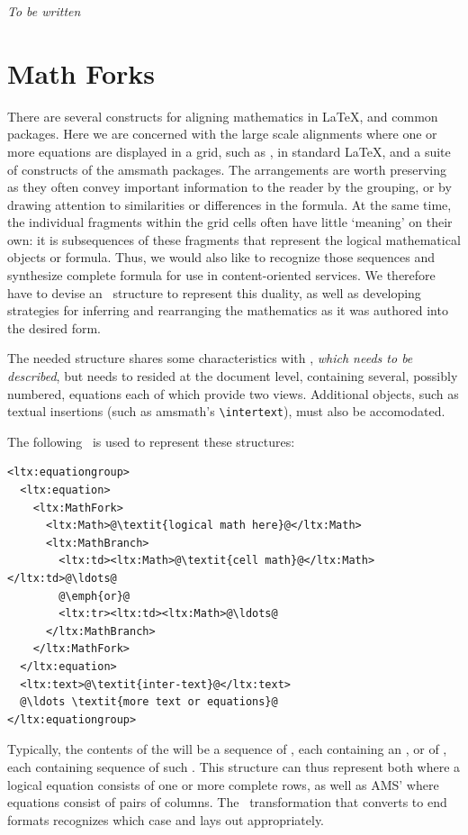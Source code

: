 \documentclass{book}
\begin{document}
\emph{To be written}

\section{Math Forks}\label{alignments.mathfork}
There are several constructs for aligning mathematics in \LaTeX, and common
packages. Here we are concerned with the large scale alignments where
one or more equations are displayed in a grid,
such as , in standard \LaTeX,
and a suite of constructs of the amsmath packages.
The arrangements are worth preserving as they often convey important information to the
reader by the grouping, or by drawing attention to similarities or differences
in the formula.   At the same time, the individual fragments within the grid
cells often have little `meaning' on their own:
it is subsequences of these fragments that represent the logical
mathematical objects or formula.  Thus, we would also like to
recognize those sequences and synthesize complete formula
for use in content-oriented services.
We therefore have to devise an \XML\ structure to represent this duality,
as well as developing strategies for inferring and rearranging
the mathematics as it was authored into the desired form.

The needed structure shares some characteristics with ,
\emph{which needs to be described},
but needs to resided at the document level, containing several,
possibly numbered, equations each of which provide two views.
Additional objects, such as textual insertions (such as amsmath's \verb|\intertext|),
must also be accomodated.

The following \XML\ is used to represent these structures:
\begin{lstlisting}[style=xml]
<ltx:equationgroup>
  <ltx:equation>
    <ltx:MathFork>
      <ltx:Math>@\textit{logical math here}@</ltx:Math>
      <ltx:MathBranch>
        <ltx:td><ltx:Math>@\textit{cell math}@</ltx:Math></ltx:td>@\ldots@
        @\emph{or}@
        <ltx:tr><ltx:td><ltx:Math>@\ldots@
      </ltx:MathBranch>
    </ltx:MathFork>
  </ltx:equation>
  <ltx:text>@\textit{inter-text}@</ltx:text>
  @\ldots \textit{more text or equations}@
</ltx:equationgroup>
\end{lstlisting}
Typically, the contents of the  will be a sequence
of , each containing an , or
of , each containing sequence of such .
This structure can thus represent both  where a logical
equation consists of one or more complete rows, as well as
AMS'  where equations consist of pairs of columns.
The \XSLT\ transformation that converts to end formats recognizes
which case and lays out appropriately.
\end{document}
